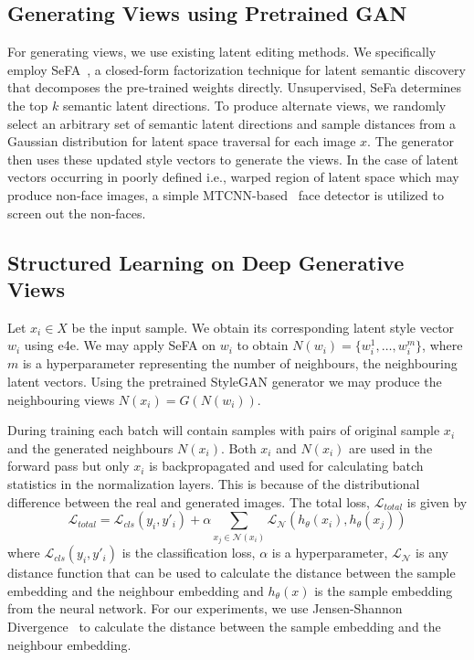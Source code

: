 \documentclass[runningheads]{llncs}
\begin{document}
\subsection{Generating Views using Pretrained GAN}
For generating views, we use existing latent editing methods. We specifically employ SeFA~\cite{sefa}, a closed-form factorization technique for latent semantic discovery that decomposes the pre-trained weights directly. Unsupervised, SeFa determines the top $k$ semantic latent directions. To produce alternate views, we randomly select an arbitrary set of semantic latent directions and sample distances from a Gaussian distribution for latent space traversal for each image $x$. The generator then uses these updated style vectors to generate the views. In the case of latent vectors occurring in poorly defined i.e., warped region of latent space which may produce non-face images, a simple MTCNN-based~\cite{mtcnn} face detector is utilized to screen out the non-faces.

\subsection{Structured Learning on Deep Generative Views}
Let $x_i \in X$ be the input sample. We obtain its corresponding latent style vector $w_i$ using e4e. We may apply SeFA on $w_i$ to obtain $N(w_i)=\{w^1_i,\ldots,w^m_i\}$, where $m$ is a hyperparameter representing the number of neighbours, the neighbouring latent vectors. Using the pretrained StyleGAN generator we may produce the neighbouring views $N(x_i)=G(N(w_i))$.

During training each batch will contain samples with pairs of original sample $x_i$ and the generated neighbours $N(x_i)$. Both $x_i$ and $N(x_i)$ are used in the forward pass but only $x_i$ is backpropagated and used for calculating batch statistics in the normalization layers. This is because of the distributional difference between the real and generated images. The total loss, $\mathcal{L}_{total}$ is given by
\begin{equation}
    \mathcal{L}_{total} = \mathcal{L}_{cls}(y_i,y'_i) + \alpha\displaystyle\sum_{x_j \in \mathcal{N}(x_i)} \mathcal{L}_{\mathcal{N}}(h_{\theta}(x_i),h_{\theta}(x_j))
\end{equation}
where $\mathcal{L}_{cls}(y_i,y'_i)$ is the classification loss, $\alpha$ is a hyperparameter, $\mathcal{L}_{\mathcal{N}}$ is any distance function that can be used to calculate the distance between the sample embedding and the neighbour embedding and $h_{\theta}(x)$ is the sample embedding from the neural network. For our experiments, we use Jensen-Shannon Divergence~\cite{jsdiv} to calculate the distance between the sample embedding and the neighbour embedding.
\end{document}
